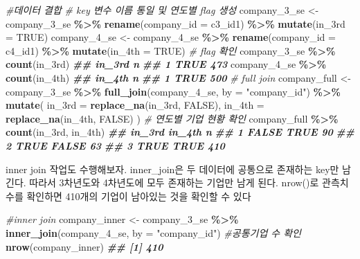 \documentclass[
]{book}
\newenvironment{Shaded}{\begin{snugshade}}{\end{snugshade}}
\newcommand{\AttributeTok}[1]{\textcolor[rgb]{0.13,0.29,0.53}{#1}}
\newcommand{\CommentTok}[1]{\textcolor[rgb]{0.56,0.35,0.01}{\textit{#1}}}
\newcommand{\ConstantTok}[1]{\textcolor[rgb]{0.56,0.35,0.01}{#1}}
\newcommand{\DocumentationTok}[1]{\textcolor[rgb]{0.56,0.35,0.01}{\textbf{\textit{#1}}}}
\newcommand{\FunctionTok}[1]{\textcolor[rgb]{0.13,0.29,0.53}{\textbf{#1}}}
\newcommand{\NormalTok}[1]{#1}
\newcommand{\OtherTok}[1]{\textcolor[rgb]{0.56,0.35,0.01}{#1}}
\newcommand{\SpecialCharTok}[1]{\textcolor[rgb]{0.81,0.36,0.00}{\textbf{#1}}}
\newcommand{\StringTok}[1]{\textcolor[rgb]{0.31,0.60,0.02}{#1}}
\begin{document}
\begin{Shaded}
\begin{Highlighting}[]
\CommentTok{\#데이터 결합}
\CommentTok{\# key 변수 이름 통일 및 연도별 flag 생성}
\NormalTok{company\_3\_se }\OtherTok{\textless{}{-}}\NormalTok{ company\_3\_se }\SpecialCharTok{\%\textgreater{}\%}
  \FunctionTok{rename}\NormalTok{(}\AttributeTok{company\_id =}\NormalTok{ c3\_id1) }\SpecialCharTok{\%\textgreater{}\%}
  \FunctionTok{mutate}\NormalTok{(}\AttributeTok{in\_3rd =} \ConstantTok{TRUE}\NormalTok{)}
\NormalTok{company\_4\_se }\OtherTok{\textless{}{-}}\NormalTok{ company\_4\_se }\SpecialCharTok{\%\textgreater{}\%}
  \FunctionTok{rename}\NormalTok{(}\AttributeTok{company\_id =}\NormalTok{ c4\_id1) }\SpecialCharTok{\%\textgreater{}\%}
  \FunctionTok{mutate}\NormalTok{(}\AttributeTok{in\_4th =} \ConstantTok{TRUE}\NormalTok{)}
\CommentTok{\# flag 확인}
\NormalTok{company\_3\_se }\SpecialCharTok{\%\textgreater{}\%}
  \FunctionTok{count}\NormalTok{(in\_3rd)}
\DocumentationTok{\#\#   in\_3rd   n}
\DocumentationTok{\#\# 1   TRUE 473}
\NormalTok{company\_4\_se }\SpecialCharTok{\%\textgreater{}\%}
  \FunctionTok{count}\NormalTok{(in\_4th)}
\DocumentationTok{\#\#   in\_4th   n}
\DocumentationTok{\#\# 1   TRUE 500}
\CommentTok{\# full join}
\NormalTok{company\_full }\OtherTok{\textless{}{-}}\NormalTok{ company\_3\_se }\SpecialCharTok{\%\textgreater{}\%}
  \FunctionTok{full\_join}\NormalTok{(company\_4\_se, }\AttributeTok{by =} \StringTok{"company\_id"}\NormalTok{) }\SpecialCharTok{\%\textgreater{}\%}
  \FunctionTok{mutate}\NormalTok{(}
    \AttributeTok{in\_3rd =} \FunctionTok{replace\_na}\NormalTok{(in\_3rd, }\ConstantTok{FALSE}\NormalTok{),}
    \AttributeTok{in\_4th =} \FunctionTok{replace\_na}\NormalTok{(in\_4th, }\ConstantTok{FALSE}\NormalTok{)}
\NormalTok{  )}
\CommentTok{\# 연도별 기업 현황 확인}
\NormalTok{company\_full }\SpecialCharTok{\%\textgreater{}\%}
  \FunctionTok{count}\NormalTok{(in\_3rd, in\_4th)}
\DocumentationTok{\#\#   in\_3rd in\_4th   n}
\DocumentationTok{\#\# 1  FALSE   TRUE  90}
\DocumentationTok{\#\# 2   TRUE  FALSE  63}
\DocumentationTok{\#\# 3   TRUE   TRUE 410}
\end{Highlighting}
\end{Shaded}

inner join 작업도 수행해보자. inner\_join은 두 데이터에 공통으로 존재하는 key만 남긴다. 따라서 3차년도와 4차년도에 모두 존재하는 기업만 남게 된다. nrow()로 관측치 수를 확인하면 410개의 기업이 남아있는 것을 확인할 수 있다

\begin{Shaded}
\begin{Highlighting}[]
\CommentTok{\#inner join}
\NormalTok{company\_inner }\OtherTok{\textless{}{-}}\NormalTok{ company\_3\_se }\SpecialCharTok{\%\textgreater{}\%}
  \FunctionTok{inner\_join}\NormalTok{(company\_4\_se, }\AttributeTok{by =} \StringTok{"company\_id"}\NormalTok{)}
\CommentTok{\#공통기업 수 확인}
\FunctionTok{nrow}\NormalTok{(company\_inner)}
\DocumentationTok{\#\# [1] 410}
\end{Highlighting}
\end{Shaded}
\end{document}
